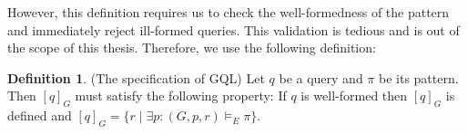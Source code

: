 \documentclass[14pt]{constructor-thesis}
\theoremstyle{definition}
\newtheorem{definition}{Definition}
\begin{document}
However, this definition requires us to check the well-formedness of the pattern and immediately reject ill-formed queries. This validation is tedious and is out of the scope of this thesis. Therefore, we use the following definition:

\begin{definition}(The specification of GQL)
  \label{def:specification-of-gql}
  Let $q$ be a query and $\pi$ be its pattern. Then $[q]_G$ must satisfy the following property:
  If $q$ is well-formed then $[q]_G$ is defined and $[q]_G = \{ r \mid \exists p : (G, p, r) \models_E \pi \}$.
\end{definition}



\end{document}
